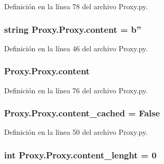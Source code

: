 Definición en la línea 78 del archivo Proxy.\-py.

\hypertarget{class_proxy_1_1_proxy_a6415f8b9913c11a773f03f25618db57c}{
\subsubsection[{content}]{\setlength{\rightskip}{0pt plus 5cm}string Proxy.\-Proxy.\-content = b''\hspace{0.3cm}{\ttfamily [static]}}}\label{class_proxy_1_1_proxy_a6415f8b9913c11a773f03f25618db57c}


Definición en la línea 46 del archivo Proxy.\-py.

\hypertarget{class_proxy_1_1_proxy_a08a9034e04e2f83ab90d64595b5946b6}{
\subsubsection[{content}]{\setlength{\rightskip}{0pt plus 5cm}Proxy.\-Proxy.\-content}}\label{class_proxy_1_1_proxy_a08a9034e04e2f83ab90d64595b5946b6}


Definición en la línea 76 del archivo Proxy.\-py.

\hypertarget{class_proxy_1_1_proxy_ae24029c912f5ea05cad1ee6635954971}{
\subsubsection[{content\-\_\-cached}]{\setlength{\rightskip}{0pt plus 5cm}Proxy.\-Proxy.\-content\-\_\-cached = False\hspace{0.3cm}{\ttfamily [static]}}}\label{class_proxy_1_1_proxy_ae24029c912f5ea05cad1ee6635954971}


Definición en la línea 50 del archivo Proxy.\-py.

\hypertarget{class_proxy_1_1_proxy_a6db9fd736b73c14f6cf809c17abf6180}{
\subsubsection[{content\-\_\-lenght}]{\setlength{\rightskip}{0pt plus 5cm}int Proxy.\-Proxy.\-content\-\_\-lenght = 0\hspace{0.3cm}{\ttfamily [static]}}}\label{class_proxy_1_1_proxy_a6db9fd736b73c14f6cf809c17abf6180}


